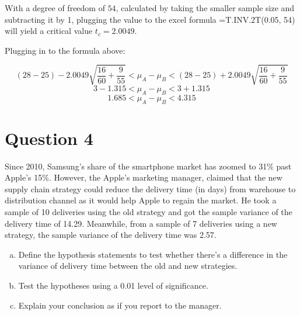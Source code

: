 \documentclass[
	11pt, %
]{assignment}
\newcommand{\fixedwidth}[1]{{\fontfamily{cmtt}\selectfont #1}} %
\begin{document}
\medskip

With a degree of freedom of \(54\), calculated by taking the smaller sample size and subtracting it by 1, plugging the value to the excel formula \fixedwidth{=T.INV.2T(0.05, 54)} will yield a critical value \(t_c = 2.0049\).

Plugging in to the formula above:

\[
	(28 - 25) - 2.0049 \sqrt{\frac{16}{60} +\frac{9}{55}} < \mu_A - \mu_B < (28 - 25) + 2.0049 \sqrt{\frac{16}{60} + \frac{9}{55}}
\]
\[
	3 - 1.315 < \mu_A - \mu_B < 3 + 1.315
\]
\[
	1.685 < \mu_A - \mu_B < 4.315
\]




\pagebreak

\section*{Question 4}
\begin{problem}
Since 2010, Samsung's share of the smartphone market has zoomed to 31\% past Apple's 15\%. However, the Apple's marketing manager, claimed that the new supply chain strategy could reduce the delivery time (in days) from warehouse to distribution channel as it would help Apple to regain the market. He took a sample of 10 deliveries using the old strategy and got the sample variance of the delivery time of 14.29. Meanwhile, from a sample of 7 deliveries using a new strategy, the sample variance of the delivery time was 2.57.

\medskip

\begin{enumerate}[a.]
	\item Define the hypothesis statements to test whether there's a difference in the variance of delivery time between the old and new strategies.
	\item Test the hypotheses using a 0.01 level of significance.
	\item Explain your conclusion as if you report to the manager.
\end{enumerate}
\end{problem}

\pagebreak
\end{document}
